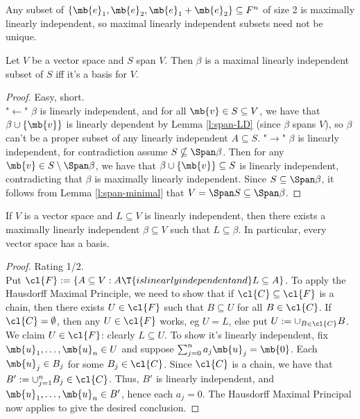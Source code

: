 \begin{example}
Any subset of $\{ \mb{e}_1, \mb{e}_2, \mb{e}_1+\mb{e}_2\} \subseteq F^n$ of size 2 is maximally linearly independent, so maximal linearly independent subsets need not be unique.
\end{example}
\begin{prop}
Let $V$ be a vector space and $S$ span $V$. Then $\beta$ is a maximal linearly independent subset of $S$ iff it's a basis for $V$.
\end{prop}
\begin{proof}
Easy, short.\\
"$\leftarrow$" $\beta$ is linearly independent, and for all $\mb{v}\in S \subseteq V$, we have that $\beta \cup \{ \mb{v}\}$ is linearly dependent by Lemma \ref{l:span-LD} (since $\beta$ spans $V$), so $\beta$ can't be a proper subset of any linearly independent $A \subseteq S$.
"$\to$" $\beta$ is linearly independent, for contradiction assume $S \nsubseteq \Span \beta$. Then for any $\mb{v}\in S \setminus \Span \beta$, we have that $\beta \cup \{ \mb{v}\} \subseteq S$ is linearly independent, contradicting that $\beta$ is maximally linearly independent.
Since $S \subseteq \Span \beta$, it follows from Lemma \ref{l:span-minimal} that $V= \Span S \subseteq \Span \beta$.
\end{proof}
\begin{thm}\label{t:basis-exists}
If $V$ is a vector space and $L \subseteq V$ is linearly independent, then there exists a maximally linearly independent $\beta \subseteq V$ such that $L \subseteq \beta$. In particular, every vector space has a basis.
\end{thm}
\begin{proof}
Rating 1/2.\\
Put $\cl{F}:= \{ A \subseteq V:A \T{ is linearly independent and }L \subseteq A \}$. To apply the Hausdorff Maximal Principle, we need to show that if $\cl{C}\subseteq \cl{F}$ is a chain, then there exists $U \in \cl{F}$ such that $B \subseteq U$ for all $B \in \cl{C}$.
If $\cl{C}= \emptyset$, then any $U \in \cl{F}$ works, eg $U=L$, else put $U:= \cup_{B \in \cl{C}}B$. We claim $U \in \cl{F}$: clearly $L \subseteq U$. To show it's linearly independent, fix $\mb{u}_1, \ldots,\mb{u}_n \in U$ and suppose $\sum_{j=0}^na_j \mb{u}_j= \mb{0}$.
Each $\mb{u}_j \in B_j$ for some $B_j \in \cl{C}$. Since $\cl{C}$ is a chain, we have that $B':= \cup_{j=1}^nB_j \in \cl{C}$. Thus, $B'$ is linearly independent, and $\mb{u}_1, \ldots, \mb{u}_n \in B'$, hence each $a_j=0$. The Hausdorff Maximal Principal now applies to give the desired conclusion.
\end{proof}
